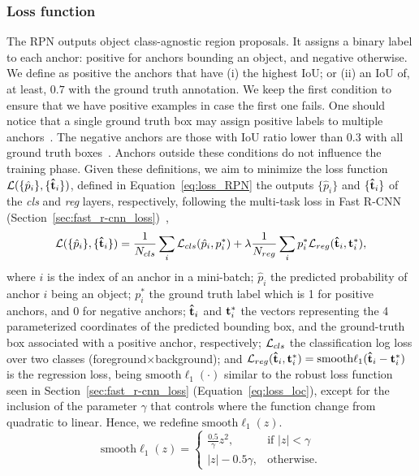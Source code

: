\subsubsection{Loss function}
%
The RPN outputs object class-agnostic region proposals.
It assigns a binary label to each anchor: positive for anchors bounding an object, and negative otherwise.
We define as positive the anchors that have
(i) the highest IoU; or
(ii) an IoU of, at least, $0.7$ with the ground truth annotation.
We keep the first condition to ensure that we have positive examples in case the first one fails.
One should notice that a single ground truth box may assign positive labels to multiple anchors~\cite{Ren2017fasterpami}.
The negative anchors are those with IoU ratio lower than $0.3$ with all ground truth boxes~\cite{Ren2017fasterpami}.
Anchors outside these conditions do not influence the training phase.
Given these definitions, we aim to minimize the loss function $\mathcal{L}( \{\hat p_i\}, \{\mathbf{\hat t}_i\} )$, defined in Equation~\eqref{eq:loss_RPN} \wrt the outputs $\{\hat p_i\}$ and ${\{\mathbf{\hat t}_i\}}$ of the {\it cls} and {\it reg} layers, respectively, following the multi-task loss in Fast R-CNN (Section~\ref{sec:fast_r-cnn_loss})~\cite{Ren2017fasterpami},
%
\begin{equation}
\mathcal{L}( \{\hat p_i\}, \{\mathbf{\hat t}_i\} ) =
\frac{1}{N_{cls}}\sum_{i} \mathcal{L}_{cls}( \hat p_i, p_i^* ) +
\lambda\frac{1}{N_{reg}}\sum_{i} p_i^*\mathcal{L}_{reg}( \mathbf{\hat t}_i, \mathbf{t}_i^*),
 \label{eq:loss_RPN}
\end{equation}
%
%
where $i$ is the index of an anchor in a mini-batch;
$\hat p_i$ the predicted probability of anchor $i$ being an object;
$p_i^*$ the ground truth label which is 1 for positive anchors, and 0 for negative anchors;
$\mathbf{\hat t}_i$ and $\mathbf{t}_i^*$ the vectors representing the 4 parameterized coordinates of the predicted bounding box, and the ground-truth box associated with a positive anchor, respectively;
$\mathcal{L}_{cls}$ the classification log loss over two classes (foreground$\times$background); and
$\mathcal{L}_{reg}(\mathbf{\hat t}_i,\mathbf{t}_i^*) = \textrm{smooth}{\ell_1}(\mathbf{\hat t}_i-\mathbf{t}_i^*)$ is the regression loss, being $\textrm{smooth}{\ell_1}(\cdot)$ similar to the robust loss function seen in Section~\ref{sec:fast_r-cnn_loss} (Equation~\eqref{eq:loss_loc}), except for the inclusion of the parameter $\gamma$ that controls where the function change from quadratic to linear.
Hence, we redefine $\textrm{smooth}\ell_1 (z)$.
%
%
\begin{equation}
 \textrm{smooth}\ell_1 (z) =
 \begin{cases}
 \frac{0.5}{\gamma}z^2, & \textrm{if } |z|< \gamma\\
 |z| - 0.5\gamma, & \textrm{otherwise}.
 \end{cases}
 \label{eq:smooth_l1_gamma}
\end{equation}
